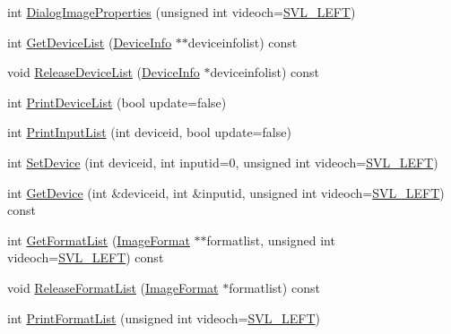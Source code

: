 \begin{DoxyCompactItemize}
\item 
int \hyperlink{classsvl_filter_source_video_capture_a7555805bed43a6cc640d0c393115e3b6}{Dialog\+Image\+Properties} (unsigned int videoch=\hyperlink{svl_definitions_8h_ab9fec7615f19c8df2919eebcab0b187f}{S\+V\+L\+\_\+\+L\+E\+F\+T})
\item 
int \hyperlink{classsvl_filter_source_video_capture_a21cb6cab9a30f845f15072fbb18d7380}{Get\+Device\+List} (\hyperlink{classsvl_filter_source_video_capture_ad656487fb2deec890dc39764152b8f8b}{Device\+Info} $\ast$$\ast$deviceinfolist) const 
\item 
void \hyperlink{classsvl_filter_source_video_capture_acc6ebb12708759516814f721fb1f71e1}{Release\+Device\+List} (\hyperlink{classsvl_filter_source_video_capture_ad656487fb2deec890dc39764152b8f8b}{Device\+Info} $\ast$deviceinfolist) const 
\item 
int \hyperlink{classsvl_filter_source_video_capture_ac898139251c6c708cd17822a794f63f7}{Print\+Device\+List} (bool update=false)
\item 
int \hyperlink{classsvl_filter_source_video_capture_a8c89ca74d3499711f6c6dcd6bdb36be6}{Print\+Input\+List} (int deviceid, bool update=false)
\item 
int \hyperlink{classsvl_filter_source_video_capture_aebf3b0b1b3c9ef04c20db692d7253256}{Set\+Device} (int deviceid, int inputid=0, unsigned int videoch=\hyperlink{svl_definitions_8h_ab9fec7615f19c8df2919eebcab0b187f}{S\+V\+L\+\_\+\+L\+E\+F\+T})
\item 
int \hyperlink{classsvl_filter_source_video_capture_a48d8ab9fc28c745aa66d41236f8a9e93}{Get\+Device} (int \&deviceid, int \&inputid, unsigned int videoch=\hyperlink{svl_definitions_8h_ab9fec7615f19c8df2919eebcab0b187f}{S\+V\+L\+\_\+\+L\+E\+F\+T}) const 
\item 
int \hyperlink{classsvl_filter_source_video_capture_aaeaf902a2fb7ac3884627bece1582909}{Get\+Format\+List} (\hyperlink{classsvl_filter_source_video_capture_a0944cc8abe4240701683128c28fa5349}{Image\+Format} $\ast$$\ast$formatlist, unsigned int videoch=\hyperlink{svl_definitions_8h_ab9fec7615f19c8df2919eebcab0b187f}{S\+V\+L\+\_\+\+L\+E\+F\+T}) const 
\item 
void \hyperlink{classsvl_filter_source_video_capture_ab6665993a38e11a5357df6087e29fa0b}{Release\+Format\+List} (\hyperlink{classsvl_filter_source_video_capture_a0944cc8abe4240701683128c28fa5349}{Image\+Format} $\ast$formatlist) const 
\item 
int \hyperlink{classsvl_filter_source_video_capture_abb0305cbcc53b3aad08fb5f9e1071bbb}{Print\+Format\+List} (unsigned int videoch=\hyperlink{svl_definitions_8h_ab9fec7615f19c8df2919eebcab0b187f}{S\+V\+L\+\_\+\+L\+E\+F\+T})

\end{DoxyCompactItemize}
